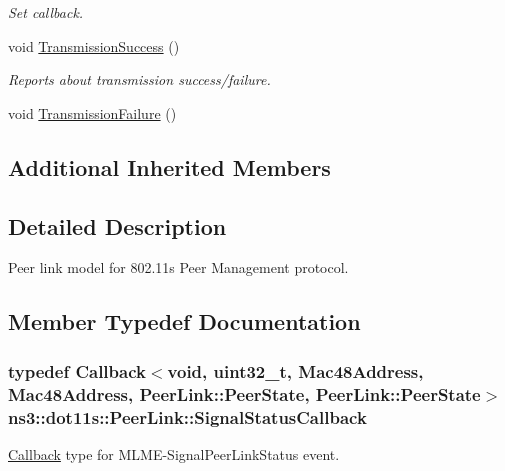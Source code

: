 \begin{DoxyCompactItemize}
\begin{DoxyCompactList}\small\item\em Set callback. \end{DoxyCompactList}\item 
void \hyperlink{classns3_1_1dot11s_1_1PeerLink_ac10e92900910f39b6f6c7dfbc384bd1c}{Transmission\+Success} ()
\begin{DoxyCompactList}\small\item\em Reports about transmission success/failure. \end{DoxyCompactList}\item 
void \hyperlink{classns3_1_1dot11s_1_1PeerLink_a311a9748947db5753d6631bacb9e0895}{Transmission\+Failure} ()
\end{DoxyCompactItemize}
\subsection*{Additional Inherited Members}


\subsection{Detailed Description}
Peer link model for 802.\+11s Peer Management protocol. 

\subsection{Member Typedef Documentation}
\subsubsection[{\texorpdfstring{Signal\+Status\+Callback}{SignalStatusCallback}}]{\setlength{\rightskip}{0pt plus 5cm}typedef {\bf Callback}$<$void, uint32\+\_\+t, {\bf Mac48\+Address}, {\bf Mac48\+Address}, {\bf Peer\+Link\+::\+Peer\+State}, {\bf Peer\+Link\+::\+Peer\+State}$>$ {\bf ns3\+::dot11s\+::\+Peer\+Link\+::\+Signal\+Status\+Callback}}\hypertarget{classns3_1_1dot11s_1_1PeerLink_a21075852eb44ac64164a4c977262bf9f}{}\label{classns3_1_1dot11s_1_1PeerLink_a21075852eb44ac64164a4c977262bf9f}


\hyperlink{classns3_1_1Callback}{Callback} type for M\+L\+M\+E-\/\+Signal\+Peer\+Link\+Status event. 



